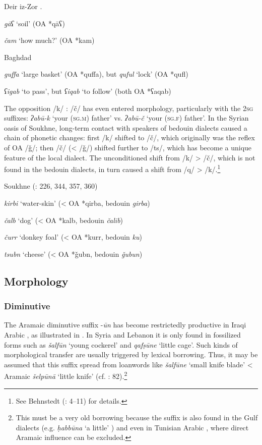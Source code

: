 \documentclass[output=paper]{langsci/langscibook}
\begin{document}
\ea\label{Deir}Deir iz-Zor \citep[42--43]{Jastrow1978}. 

\textit{gāʕ} ‘soil’ (OA *qāʕ)

\textit{čam} ‘how much?’ (OA *kam)
\z

\ea\label{Baghdad}Baghdad \citep[18--19]{Palva2009}

\textit{guffa} ‘large basket’ (OA *quffa), but \textit{quful} ‘lock’ (OA *qufl)

\textit{ʕigab} ‘to pass’, but \textit{ʕiqab} ‘to follow’ (both OA *ʕaqab)
\z

The opposition /k/ : /č/ has even entered morphology, particularly with the 2\textsc{sg} suffixes: \textit{ʔabū-k} `your (\textsc{sg.m}) father' vs. \textit{ʔabū-č} ‘your (\textsc{sg.f}) father’. In the Syrian oasis of Soukhne, long-term contact with speakers of bedouin dialects caused a chain of phonetic changes: first /k/ shifted to /č/, which originally was the reflex of OA /ǧ/; then /č/ (< /ǧ/) shifted further to /ts/, which has become a unique feature of the local dialect. The unconditioned shift from /k/ > /č/, which is not found in the bedouin dialects, in turn caused a shift from /q/ > /k/.\footnote{See Behnstedt (\citeyear{Behnstedt1994Soukhne}: 4--11) for details.}

\ea
Soukhne (\citealt{Behnstedt1994Soukhne}: 226, 344, 357, 360)

\textit{kirbi} ‘water-skin’ (< OA *qirba, bedouin \textit{girba})

\textit{čalb} ‘dog’ (< OA *kalb, bedouin \textit{čalib})

\textit{čurr} ‘donkey foal’ (< OA *kurr, bedouin \textit{ku\R\R})

\textit{tsubn} ‘cheese’ (< OA *ǧubn, bedouin \textit{ǧubun})
\z

\subsection{Morphology}
\subsubsection{Diminutive}
The Aramaic diminutive suffix -\textit{ūn} has become restrictedly productive in Iraqi Arabic \citep[72]{Masliyah1997}, as illustrated in . In Syria and Lebanon it is only found in fossilized forms such as \textit{šalfūn} ‘young cockerel’ and \textit{qafṣūne} ‘little cage’.  Such kinds of morphological transfer are usually triggered by lexical borrowing. Thus, it may be assumed that this suffix spread from loanwords like \textit{šalfūne} ‘small knife blade’ < Aramaic \textit{šelpūnā} ‘little knife’ (cf. \citealt{Féghali1918}: 82).\footnote{This must be a very old borrowing because the suffix is also found in the Gulf dialects (e.g. \textit{ḥabbūna} ‘a little’ \citealt[279]{Holes2002}) and even in Tunisian Arabic \citep[496]{Singer1984}, where direct Aramaic influence can be excluded.}
\end{document}
